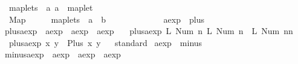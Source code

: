 \begin{isabellebody}
\ \ {\isachardoublequoteopen}{\isacharunderscore}maplets{\isachardoublequoteclose}\ {\isacharcolon}{\isacharcolon}\ {\isachardoublequoteopen}{\isacharbrackleft}{\isacharprime}a{\isacharcomma}\ {\isacharprime}a{\isacharbrackright}\ {\isasymRightarrow}\ maplet{\isachardoublequoteclose}\ \ \ \ \ \ \ \ \ \ \ \ \ {\isacharparenleft}{\isachardoublequoteopen}{\isacharunderscore}\ {\isacharslash}{\isacharbrackleft}{\isacharcolon}{\isacharequal}{\isacharbrackright}{\isacharslash}\ {\isacharunderscore}{\isachardoublequoteclose}{\isacharparenright}\isanewline
\ \ {\isachardoublequoteopen}{\isacharunderscore}Map{\isachardoublequoteclose}\ \ \ \ \ {\isacharcolon}{\isacharcolon}\ {\isachardoublequoteopen}maplets\ {\isasymRightarrow}\ {\isacharprime}a\ {\isasymrightharpoonup}\ {\isacharprime}b{\isachardoublequoteclose}\ \ \ \ \ \ \ \ \ \ \ \ {\isacharparenleft}{\isachardoublequoteopen}{\isacharparenleft}{}{\isacharless}{\isacharunderscore}{\isachargreater}{\isacharparenright}{\isachardoublequoteclose}{\isacharparenright}\isanewline
\isanewline
{}\isamarkupfalse%
\ aexp\ {\isacharcolon}{\isacharcolon}\ plus\ \isanewline
{}\isamarkupfalse%
\ plus{\isacharunderscore}aexp\ {\isacharcolon}{\isacharcolon}\ {\isachardoublequoteopen}aexp\ {\isasymRightarrow}\ aexp\ {\isasymRightarrow}\ aexp{\isachardoublequoteclose}\ \isanewline
\ \ {\isachardoublequoteopen}plus{\isacharunderscore}aexp\ {\isacharparenleft}L\ {\isacharparenleft}Num\ n{}{\isacharparenright}{\isacharparenright}\ {\isacharparenleft}L\ {\isacharparenleft}Num\ n{}{\isacharparenright}{\isacharparenright}\ {\isacharequal}\ L\ {\isacharparenleft}Num\ {\isacharparenleft}n{}{\isacharplus}n{}{\isacharparenright}{\isacharparenright}{\isachardoublequoteclose}\ {\isacharbar}\isanewline
\ \ {\isachardoublequoteopen}plus{\isacharunderscore}aexp\ x\ y\ {\isacharequal}\ Plus\ x\ y{\isachardoublequoteclose}\isanewline
\isanewline
{}\isamarkupfalse%
%
\isadelimproof
\ %
\endisadelimproof
%
\isatagproof
{}\isamarkupfalse%
\ standard%
\endisatagproof
{\isafoldproof}%
%
\isadelimproof
%
\endisadelimproof
\isanewline
{}\isamarkupfalse%
\isanewline
\isanewline
{}\isamarkupfalse%
\ aexp\ {\isacharcolon}{\isacharcolon}\ minus\ \isanewline
{}\isamarkupfalse%
\ minus{\isacharunderscore}aexp\ {\isacharcolon}{\isacharcolon}\ {\isachardoublequoteopen}aexp\ {\isasymRightarrow}\ aexp\ {\isasymRightarrow}\ aexp{\isachardoublequoteclose}\ \isanewline

\end{isabellebody}
